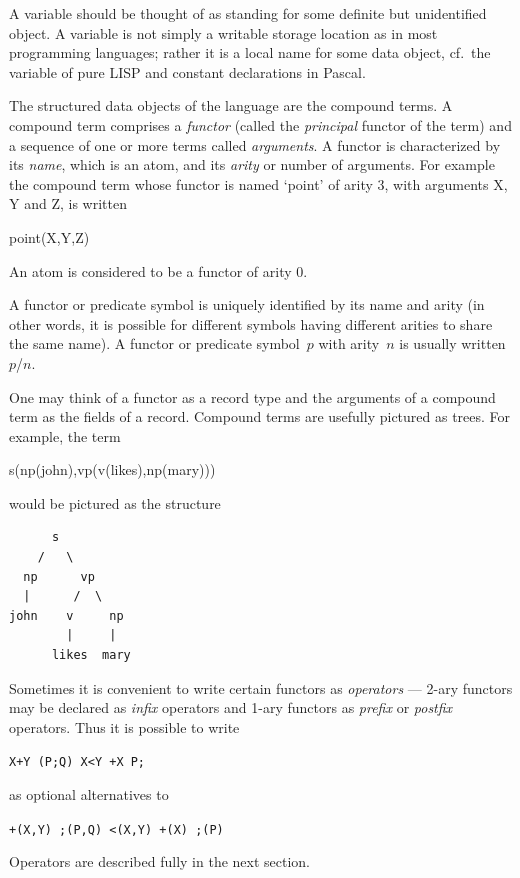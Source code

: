 A variable should be thought of as standing for some definite but
unidentified object.
A variable is not simply a writable
storage location as in most programming languages; rather it is a
local name for some data object, cf.\ the variable of pure LISP and
constant declarations in Pascal.

The structured data objects of the language are the compound terms.
A compound term comprises a {\em functor} (called the {\em principal} functor of
the term) and a sequence of one or more terms called {\em arguments}.
A functor is characterized by its {\em name}, which is an atom, and its
{\em arity} or number of arguments.
For example the compound term whose functor is
named `point' of arity 3, with arguments X, Y and Z, is written
\begin{center}
{point(X,Y,Z)}
\end{center}
An atom is considered to be a functor of arity 0.

A functor or predicate symbol is uniquely identified by its name and arity
(in other words, it is possible for different symbols having different
arities to share the same name).
A functor or predicate symbol~$p$ with arity~$n$ is usually written~$p$/$n$.

One may think of a functor as a record type and the
arguments of a compound term as the fields of a record.
Compound terms are usefully pictured as trees.
For example, the term
\begin{center}
{s(np(john),vp(v(likes),np(mary)))}
\end{center}
would be pictured as the structure
\begin{center}
\begin{minipage}{1in}
\begin{verbatim}
      s
    /   \
  np      vp
  |      /  \
john    v     np
        |     |
      likes  mary
\end{verbatim}
\end{minipage}
\end{center}

Sometimes it is convenient to write certain functors as {\em operators}
--- 2-ary functors may be declared as {\em infix} operators
and 1-ary functors as {\em prefix} or {\em postfix} operators.
Thus it is possible to write
\begin{center}
{\tt X+Y     (P;Q)     X<Y      +X     P;}
\end{center}
as optional alternatives to
\begin{center}
{\tt +(X,Y)   ;(P,Q)   <(X,Y)   +(X)   ;(P)}
\end{center}
Operators are described fully in the next section.

